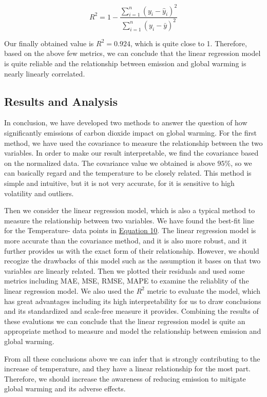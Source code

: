 \documentclass[12pt,a4paper]{article}
\begin{document}
    \begin{equation}
        R^2=1-\frac{\sum_{i=1}^{n}(y_i-\hat{y}_i)^2}{\sum_{i=1}^{n}(y_i-\bar{y})^2}
    \end{equation}
    
    Our finally obtained value is $R^2=0.924$, which is quite close to 1. Therefore, based on the above few metrics, we can conclude that the linear regression model is quite reliable and the relationship between  emission and global warming is nearly linearly correlated.

    \subsection{Results and Analysis}
    In conclusion, we have developed two methods to answer the question of how significantly emissions of carbon dioxide impact on global warming. For the first method, we have used the covariance to measure the relationship between the two variables. In order to make our result interpretable, we find the covariance based on the normalized data. The covariance value we obtained is above $95\%$, so we can basically regard  and the temperature to be closely related. This method is simple and intuitive, but it is not very accurate, for it is sensitive to high volatility and outliers. 

    Then we consider the linear regression model, which is also a typical method to measure the relationship between two variables. We have found the best-fit line for the Temperature- data points in \hyperref[10]{Equation 10}. The linear regression model is more accurate than the covariance method, and it is also more robust, and it further provides us with the exact form of their relationship. However, we should recogize the drawbacks of this model such as the assumption it bases on that two variables are linearly related. Then we plotted their residuals and used some metrics including MAE, MSE, RMSE, MAPE to examine the reliablity of the linear regression model. We also used the $R^2$ metric to evaluate the model, which has great advantages including its high interpretability for us to draw conclusions and its standardized and scale-free measure it provides. Combining the results of these evalutions we can conclude that the linear regression model is quite an appropriate method to measure and model the relationship between  emission and global warming.

    From all these conclusions above we can infer that  is strongly contributing to the increase of temperature, and they have a linear relationship for the most part. Therefore, we should increase the awareness of reducing  emission to mitigate global warming and its adverse effects.
\end{document}

